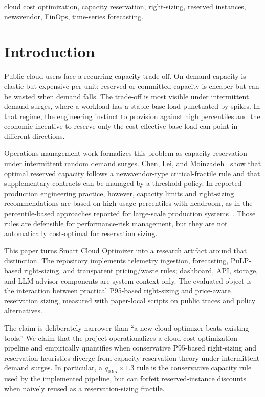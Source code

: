 \documentclass[conference]{IEEEtran}
\begin{document}
    \begin{IEEEkeywords}
    cloud cost optimization, capacity reservation, right-sizing, reserved
    instances, newsvendor, FinOps, time-series forecasting.
    \end{IEEEkeywords}

    \section{Introduction}

    Public-cloud users face a recurring capacity trade-off. On-demand capacity is
    elastic but expensive per unit; reserved or committed capacity is cheaper but
    can be wasted when demand falls. The trade-off is most visible under
    intermittent demand surges, where a workload has a stable base load punctuated
    by spikes. In that regime, the engineering instinct to provision against high
    percentiles and the economic incentive to reserve only the cost-effective base
    load can point in different directions.

    Operations-management work formalizes this problem as capacity reservation
    under intermittent random demand surges. Chen, Lei, and
    Moinzadeh~\cite{chen2024capacity} show that optimal reserved capacity follows
    a newsvendor-type critical-fractile rule and that supplementary contracts can
    be managed by a threshold policy. In reported production engineering practice,
    however, capacity limits and right-sizing recommendations are based on high usage
    percentiles with headroom, as in the percentile-based approaches reported for
    large-scale production systems~\cite{rzadca2020autopilot,cortez2017resource,cahoon2022doppler}.
    Those rules are defensible for performance-risk management, but they are not
    automatically cost-optimal for reservation sizing.

    This paper turns Smart Cloud Optimizer into a research artifact around that
    distinction. The repository implements telemetry ingestion, forecasting,
    PuLP-based right-sizing, and transparent pricing/waste rules; dashboard, API,
    storage, and LLM-advisor components are system context only. The evaluated
    object is the interaction between practical P95-based right-sizing and
price-aware reservation sizing, measured with paper-local scripts on public
traces and policy alternatives.

The claim is deliberately narrower than ``a new cloud optimizer beats existing
tools.'' We claim that the project operationalizes a cloud cost-optimization
pipeline and empirically quantifies when conservative P95-based right-sizing
and reservation heuristics diverge from capacity-reservation theory under
intermittent demand surges. In particular, a $q_{0.95}\times1.3$ rule is the
conservative capacity rule used by the implemented pipeline, but can forfeit
reserved-instance discounts when naively reused as a reservation-sizing
fractile.
\end{document}
